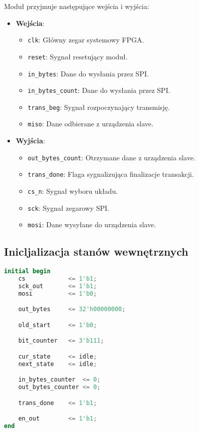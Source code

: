 \documentclass[a4paper,12pt]{article}
\begin{document}
Moduł przyjmuje następujące wejścia i wyjścia:
\begin{itemize}
    \item \textbf{Wejścia}:
    \begin{itemize}
        \item \texttt{clk}: Główny zegar systemowy FPGA.
        \item \texttt{reset}: Sygnał resetujący moduł.
        \item \texttt{in\_bytes}: Dane do wysłania przez SPI.
        \item \texttt{in\_bytes\_count}: Dane do wysłania przez SPI.
        \item \texttt{trans\_beg}: Sygnał rozpoczynający transmisję.
        \item \texttt{miso}: Dane odbierane z urządzenia slave.
    \end{itemize}
    \item \textbf{Wyjścia}:
    \begin{itemize}
        \item \texttt{out\_bytes\_count}: Otrzymane dane z urządzenia slave.
        \item \texttt{trans\_done}: Flaga sygnalizująca finalizacje transakcji.
        \item \texttt{cs\_n}: Sygnał wyboru układu.
        \item \texttt{sck}: Sygnał zegarowy SPI.
        \item \texttt{mosi}: Dane wysyłane do urządzenia slave.
    \end{itemize}
\end{itemize}

\subsection*{Inicljalizacja stanów wewnętrznych}
\begin{lstlisting}[language=verilog]
initial begin
    cs            <= 1'b1;
    sck_out       <= 1'b1;
    mosi          <= 1'b0;

    out_bytes     <= 32'h00000000;

    old_start     <= 1'b0;

    bit_counter   <= 3'b111;

    cur_state     <= idle;
    next_state    <= idle;

    in_bytes_counter  <= 0;
    out_bytes_counter <= 0;

    trans_done    <= 1'b1;

    en_out        <= 1'b1;
end
\end{lstlisting}
\end{document}
